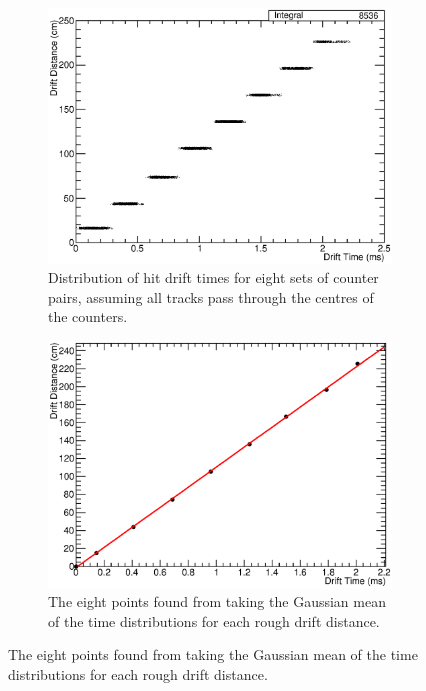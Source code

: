 \begin{figure}
  \centering
  \begin{subfigure}[t]{0.48\linewidth}
    \centering
    \includegraphics[width=\textwidth]{DistanceDriftTime.eps}
    \caption{Distribution of hit drift times for eight sets of counter pairs, assuming all tracks pass through the centres of the counters.}
    \label{fig:DistanceDriftTime}
  \end{subfigure}
  \hfill
  \begin{subfigure}[t]{0.48\linewidth}
    \centering
    \includegraphics[width=\textwidth]{DriftVelocity.eps}
    \caption{The eight points found from taking the Gaussian mean of the time distributions for each rough drift distance.}
    \label{fig:DriftVelocityGraph}
  \end{subfigure}

\end{figure}
